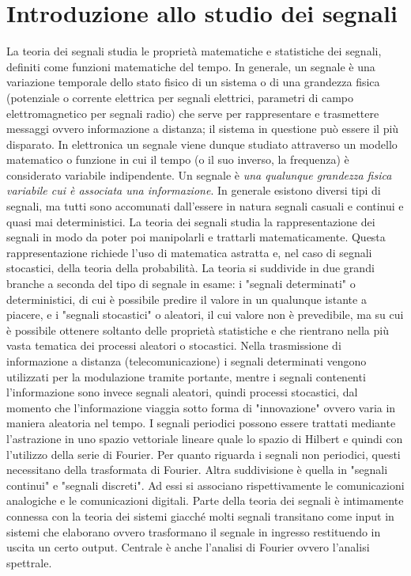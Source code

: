 \documentclass[12pt,oneside,openany]{memoir}
\numberwithin{equation}{subsection}
\begin{document}
\section{Introduzione allo studio dei segnali}
La teoria dei segnali studia le propriet\`a matematiche e statistiche dei
segnali, definiti come funzioni matematiche del tempo. In generale, un segnale
\`e una variazione temporale dello stato fisico di un sistema o di una grandezza
fisica (potenziale o corrente elettrica per segnali elettrici, parametri di
campo elettromagnetico per segnali radio) che serve per rappresentare e
trasmettere messaggi ovvero informazione a distanza; il sistema in questione
pu\`o essere il pi\`u disparato. In elettronica un segnale viene dunque studiato
attraverso un modello matematico o funzione in cui il tempo (o il suo inverso,
la frequenza) \`e considerato variabile indipendente.
\bigbreak
Un segnale \`e \textit{una qualunque grandezza fisica variabile cui \`e
associata una informazione}.
\bigbreak
In generale esistono diversi tipi di segnali, ma tutti sono accomunati
dall'essere in natura segnali casuali e continui e quasi mai deterministici. La
teoria dei segnali studia la rappresentazione dei segnali in modo da poter poi
manipolarli e trattarli matematicamente. Questa rappresentazione richiede l'uso
di matematica astratta e, nel caso di segnali stocastici, della teoria della
probabilit\`a.
\bigbreak
La teoria si suddivide in due grandi branche a seconda del tipo di segnale in
esame: i "segnali determinati" o deterministici, di cui è possibile predire il
valore in un qualunque istante a piacere, e i "segnali stocastici" o aleatori,
il cui valore non \`e prevedibile, ma su cui \`e possibile ottenere soltanto
delle propriet\`a statistiche e che rientrano nella pi\`u vasta tematica dei
processi aleatori o stocastici.
\bigbreak
Nella trasmissione di informazione a distanza (telecomunicazione) i segnali
determinati vengono utilizzati per la modulazione tramite portante, mentre i
segnali contenenti l'informazione sono invece segnali aleatori, quindi processi
stocastici, dal momento che l'informazione viaggia sotto forma di "innovazione"
ovvero varia in maniera aleatoria nel tempo.
\bigbreak
I segnali periodici possono essere trattati mediante l'astrazione in uno spazio
vettoriale lineare quale lo spazio di Hilbert e quindi con l'utilizzo della
serie di Fourier. Per quanto riguarda i segnali non periodici, questi
necessitano della trasformata di Fourier.
\bigbreak
Altra suddivisione \`e quella in "segnali continui" e "segnali discreti". Ad
essi si associano rispettivamente le comunicazioni analogiche e le comunicazioni
digitali.
\bigbreak
Parte della teoria dei segnali \`e intimamente connessa con la teoria dei
sistemi giacch\'e molti segnali transitano come input in sistemi che elaborano
ovvero trasformano il segnale in ingresso restituendo in uscita un certo output.
Centrale \`e anche l'analisi di Fourier ovvero l'analisi spettrale. 
\end{document}
